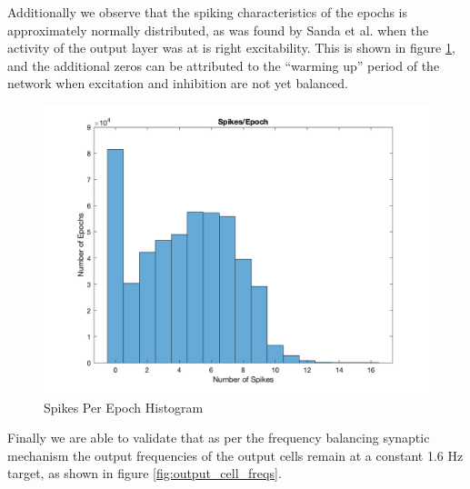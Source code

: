 \documentclass[11pt, twocolumn]{article}
\begin{document}
Additionally we observe that the spiking characteristics of the epochs is approximately normally distributed, as was found by Sanda et al. \cite{sanda2017multi} when the activity of the output layer was at is right excitability. This is shown in figure \ref{fig:spikes_per_epoch}, and the additional zeros can be attributed to the ``warming up'' period of the network when excitation and inhibition are not yet balanced.

\begin{figure}[H]
	\centering
	\includegraphics[width=\linewidth]{spikes_per_epoch}
	\caption{Spikes Per Epoch Histogram}
	\label{fig:spikes_per_epoch}
\end{figure}

Finally we are able to validate that as per the frequency balancing synaptic mechanism the output frequencies of the output cells remain at a constant 1.6 Hz target, as shown in figure \ref{fig:output_cell_freqs}.
\end{document}
